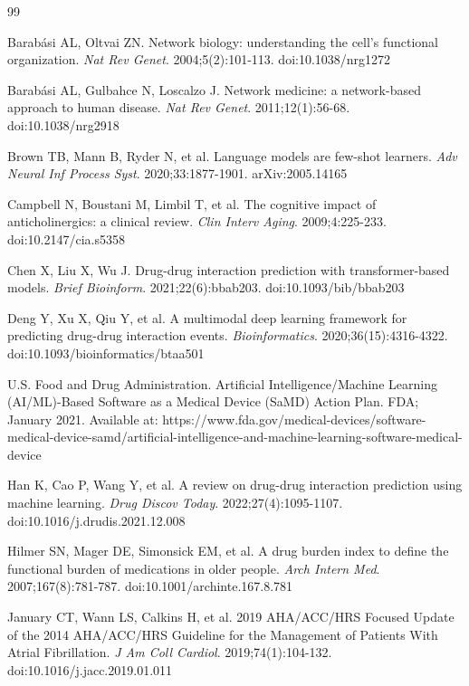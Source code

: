 \documentclass[11pt,a4paper]{article}
\begin{document}

\begin{thebibliography}{99}

Barab\'{a}si AL, Oltvai ZN.
Network biology: understanding the cell's functional organization.
\textit{Nat Rev Genet}. 2004;5(2):101-113. doi:10.1038/nrg1272

Barab\'{a}si AL, Gulbahce N, Loscalzo J.
Network medicine: a network-based approach to human disease.
\textit{Nat Rev Genet}. 2011;12(1):56-68. doi:10.1038/nrg2918

Brown TB, Mann B, Ryder N, et al.
Language models are few-shot learners.
\textit{Adv Neural Inf Process Syst}. 2020;33:1877-1901. arXiv:2005.14165

Campbell N, Boustani M, Limbil T, et al.
The cognitive impact of anticholinergics: a clinical review.
\textit{Clin Interv Aging}. 2009;4:225-233. doi:10.2147/cia.s5358

Chen X, Liu X, Wu J.
Drug-drug interaction prediction with transformer-based models.
\textit{Brief Bioinform}. 2021;22(6):bbab203. doi:10.1093/bib/bbab203

Deng Y, Xu X, Qiu Y, et al.
A multimodal deep learning framework for predicting drug-drug interaction events.
\textit{Bioinformatics}. 2020;36(15):4316-4322. doi:10.1093/bioinformatics/btaa501

U.S. Food and Drug Administration.
Artificial Intelligence/Machine Learning (AI/ML)-Based Software as a Medical Device (SaMD) Action Plan.
FDA; January 2021. Available at: https://www.fda.gov/medical-devices/software-medical-device-samd/artificial-intelligence-and-machine-learning-software-medical-device

Han K, Cao P, Wang Y, et al.
A review on drug-drug interaction prediction using machine learning.
\textit{Drug Discov Today}. 2022;27(4):1095-1107. doi:10.1016/j.drudis.2021.12.008

Hilmer SN, Mager DE, Simonsick EM, et al.
A drug burden index to define the functional burden of medications in older people.
\textit{Arch Intern Med}. 2007;167(8):781-787. doi:10.1001/archinte.167.8.781

January CT, Wann LS, Calkins H, et al.
2019 AHA/ACC/HRS Focused Update of the 2014 AHA/ACC/HRS Guideline for the Management of Patients With Atrial Fibrillation.
\textit{J Am Coll Cardiol}. 2019;74(1):104-132. doi:10.1016/j.jacc.2019.01.011


\end{thebibliography}
\end{document}
